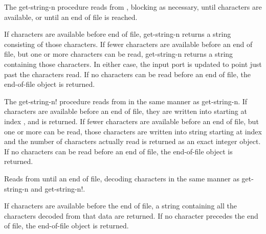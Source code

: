 \begin{entry}{%
}
   

The {\cf get-string-n} procedure reads
from , blocking as necessary, until 
 characters are available, or until an end of
file is reached.
   
If  characters are available before end of file, {\cf
  get-string-n} returns a string consisting of those 
characters. If fewer characters are available before an end of file,
but one or more characters can be read,
{\cf get-string-n} returns a string containing
those characters. In either case, the input port is updated to point
just past the characters read. If no characters can be read before an 
end of file, the end-of-file object is returned.
\end{entry}

\begin{entry}{%
}


The {\cf get-string-n!} procedure reads from  in the same manner as {\cf
  get-string-n}.  If  characters are available
before an end of file, they are written into 
starting at index , and  is returned. If fewer
characters are available before an end of file, but one
or more can be read, those characters are written into string
starting at index  and the number of characters actually read is
returned as an exact integer object. If no characters can be read before an end of file,
the end-of-file object is returned.
\end{entry}   

\begin{entry}{%
}
   
Reads from  until an end of file, decoding
characters in the same manner as {\cf get-string-n} and {\cf get-string-n!}.
   
If characters are available before the end of file, a string
containing all the characters decoded from that data are returned. If no character
precedes the end of file, the end-of-file object is
returned.
\end{entry}

